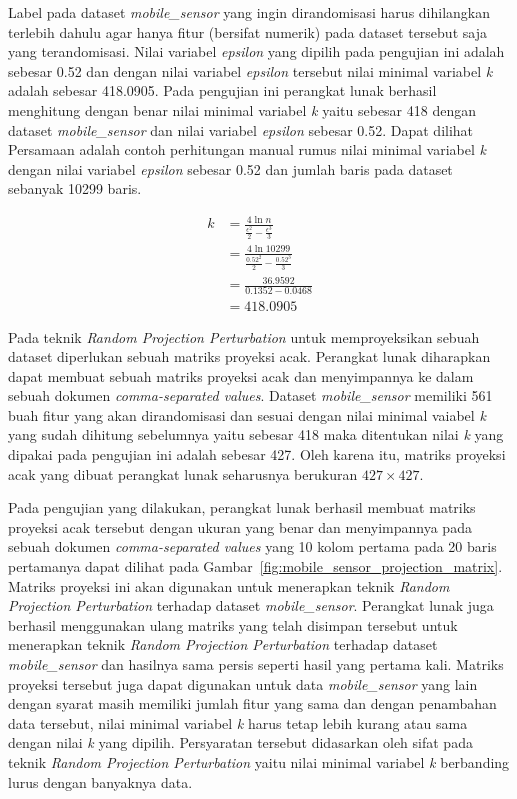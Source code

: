 Label pada dataset \textit{mobile\_sensor} yang ingin dirandomisasi harus dihilangkan terlebih dahulu agar hanya fitur (bersifat numerik) pada dataset tersebut saja yang terandomisasi. Nilai variabel \textit{epsilon} yang dipilih pada pengujian ini adalah sebesar 0.52 dan dengan nilai variabel \textit{epsilon} tersebut nilai minimal variabel \textit{k} adalah sebesar 418.0905. Pada pengujian ini perangkat lunak berhasil menghitung dengan benar nilai minimal variabel \textit{k} yaitu sebesar 418 dengan dataset \textit{mobile\_sensor} dan nilai variabel \textit{epsilon} sebesar 0.52. Dapat dilihat Persamaan adalah contoh perhitungan manual rumus nilai minimal variabel \textit{k} dengan nilai variabel \textit{epsilon} sebesar 0.52 dan jumlah baris pada dataset sebanyak 10299 baris.

\begin{align*}
	k &= \frac{4\ln{n}}{\frac{\epsilon^{2}}{2}-\frac{\epsilon^{3}}{3}} \\
	&= \frac{4\ln{10299}}{\frac{0.52^{2}}{2}-\frac{0.52^{3}}{3}} \\
	&= \frac{36.9592}{0.1352-0.0468} \\
	&= 418.0905
\end{align*}

Pada teknik \textit{Random Projection Perturbation} untuk memproyeksikan sebuah dataset diperlukan sebuah matriks proyeksi acak. Perangkat lunak diharapkan dapat membuat sebuah matriks proyeksi acak dan menyimpannya ke dalam sebuah dokumen \textit{comma-separated values}. Dataset \textit{mobile\_sensor} memiliki 561 buah fitur yang akan dirandomisasi dan sesuai dengan nilai minimal vaiabel \textit{k} yang sudah dihitung sebelumnya yaitu sebesar 418 maka ditentukan nilai \textit{k} yang dipakai pada pengujian ini adalah sebesar 427. Oleh karena itu, matriks proyeksi acak yang dibuat perangkat lunak seharusnya berukuran \(427\times427\).

Pada pengujian yang dilakukan, perangkat lunak berhasil membuat matriks proyeksi acak tersebut dengan ukuran yang benar dan menyimpannya pada sebuah dokumen \textit{comma-separated values} yang 10 kolom pertama pada 20 baris pertamanya dapat dilihat pada Gambar~\ref{fig:mobile_sensor_projection_matrix}. Matriks proyeksi ini akan digunakan untuk menerapkan teknik \textit{Random Projection Perturbation} terhadap dataset \textit{mobile\_sensor}. Perangkat lunak juga berhasil menggunakan ulang matriks yang telah disimpan tersebut untuk menerapkan teknik \textit{Random Projection Perturbation} terhadap dataset \textit{mobile\_sensor} dan hasilnya sama persis seperti hasil yang pertama kali. Matriks proyeksi tersebut juga dapat digunakan untuk data \textit{mobile\_sensor} yang lain dengan syarat masih memiliki jumlah fitur yang sama dan dengan penambahan data tersebut, nilai minimal variabel \textit{k} harus tetap lebih kurang atau sama dengan nilai \textit{k} yang dipilih. Persyaratan tersebut didasarkan oleh sifat pada teknik \textit{Random Projection Perturbation} yaitu nilai minimal variabel \textit{k} berbanding lurus dengan banyaknya data.

